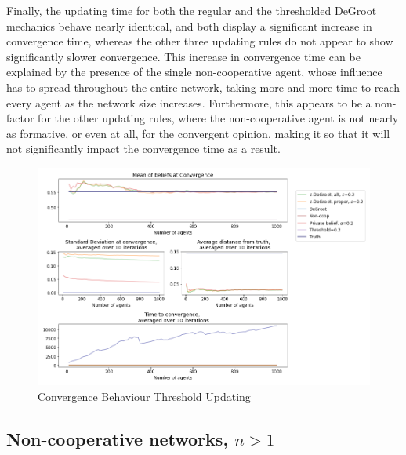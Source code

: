 \documentclass{article}
\begin{document}
\noindent Finally, the updating time for both the regular and the thresholded DeGroot mechanics behave nearly identical, and both display a significant increase in convergence time, whereas the other three updating rules do not appear to show significantly slower convergence. This increase in convergence time can be explained by the presence of the single non-cooperative agent, whose influence has to spread throughout the entire network, taking more and more time to reach every agent as the network size increases. Furthermore, this appears to be a non-factor for the other updating rules, where the non-cooperative agent is not nearly as formative, or even at all, for the convergent opinion, making it so that it will not significantly impact the convergence time as a result.

\begin{center}
    \begin{figure}[!htbp]
        \centering
        \includegraphics[width=1.2\textwidth]{ThesisKI/Images/WisdomCompare1.png}
        \caption{Convergence Behaviour Threshold Updating}
        \label{noncoop1:compare}
    \end{figure}
\end{center}

\subsection{Non-cooperative networks, $n > 1$}
\end{document}
